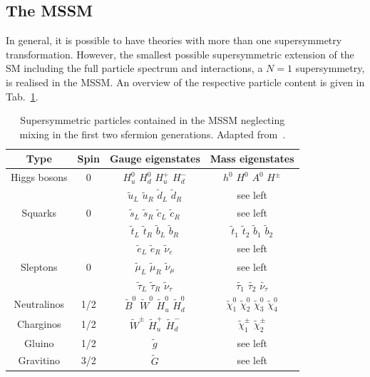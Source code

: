 \subsection{The MSSM}
\label{subsec:mssm}
In general, it is possible to have theories with more than one supersymmetry transformation. However, the smallest possible supersymmetric extension of the SM including the full particle spectrum and interactions, \ie a $N = 1$ supersymmetry, is realised in the MSSM. An overview of the respective particle content is given in Tab.~\ref{tab:mssm_particles}. 
\begin{table}[!t] 
  \centering
  \label{tab:mssm_particles}
    \begin{tabular}{cccc}
      \toprule
      Type & Spin & Gauge eigenstates & Mass eigenstates \\
      \midrule
      \midrule
      Higgs bosons & 0 & $H_{u}^{0}$ $H_{d}^{0}$ $H_{u}^{+}$ $H_{d}^{-}$ & $h^{0}$ $H^{0}$ $A^{0}$ $H^{\pm}$  \\
      \midrule
      & & $\tilde{u}_{L}$ $\tilde{u}_{R}$ $\tilde{d}_{L}$ $\tilde{d}_{R}$ &  see left \\
      Squarks & 0 & $\tilde{s}_{L}$ $\tilde{s}_{R}$ $\tilde{c}_{L}$ $\tilde{c}_{R}$  & see left \\
      & & $\tilde{t}_{L}$ $\tilde{t}_{R}$ $\tilde{b}_{L}$ $\tilde{b}_{R}$ & $\tilde{t}_{1}$ $\tilde{t}_{2}$ $\tilde{b}_{1}$ $\tilde{b}_{2}$ \\
      \midrule
      & & $\tilde{e}_{L}$ $\tilde{e}_{R}$ $\tilde{\nu}_{e}$ &  see left \\
      Sleptons  & 0 & $\tilde{\mu}_{L}$ $\tilde{\mu}_{R}$ $\tilde{\nu}_{\mu}$ & see left \\
      & & $\tilde{\tau}_{L}$ $\tilde{\tau}_{R}$ $\tilde{\nu}_{\tau}$ & $\tilde{\tau_{1}}$ $\tilde{\tau_{2}}$ $\tilde{\nu_{\tau}}$ \\
      \midrule
      Neutralinos  & 1/2 & $\tilde{B}^{0}$ $\tilde{W}^{0}$ $\tilde{H}_{u}^{0}$ $\tilde{H}_{d}^{0}$ & $\tilde{\chi}_{1}^{0}$ $\tilde{\chi}_{2}^{0}$ $\tilde{\chi}_{3}^{0}$ $\tilde{\chi}_{4}^{0}$ \\
      \midrule
      Charginos & 1/2 & $\tilde{W}^{\pm}$ $\tilde{H}_{u}^{+}$ $\tilde{H}_{d}^{-}$ & $\tilde{\chi}_{1}^{\pm}$ $\tilde{\chi}_{2}^{\pm}$ \\
      \midrule
      Gluino & 1/2 & $\tilde{g}$ & see left \\
      \midrule
      Gravitino & 3/2 & $\tilde{G}$ & see left \\
      \bottomrule
    \end{tabular}%
 \caption{Supersymmetric particles contained in the MSSM neglecting mixing in the first two sfermion generations. Adapted from~\cite{Martin:1997ns}.} 
\end{table}
